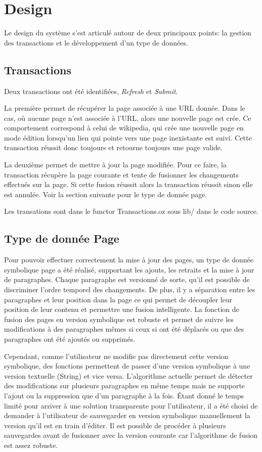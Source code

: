 \documentclass{article}
\begin{document}
	
	\section{Design}
	Le design du système s'est articulé autour de deux principaux points: la gestion des transactions et le développement
	d'un type de données.
	
	\subsection{Transactions}
	Deux transactions ont été identifiées, \textit{Refresh} et \textit{Submit}.  
	
	La première permet de récupérer la page associée à une URL donnée.  Dans le cas, où aucune page 
	n'est associée à l'URL, alors une nouvelle page est crée.  Ce comportement
	correspond à celui de wikipedia, qui crée une nouvelle page en mode édition lorsqu'un lien qui pointe vers une page
	inexistante est suivi.  Cette transaction réussit donc toujours et retourne toujours une page valide.
	
	La deuxième permet de mettre à jour la page modifiée.  Pour ce faire, la transaction récupère la page
	courante et tente de fusionner les changements effectués sur la page.  Si cette fusion réussit alors
	la transaction réussit sinon elle est annulée.  Voir la section suivante pour le type de donnée page.
	
	Les transations sont dans le functor Transactions.oz sous lib/ dans le code source.
	
	\subsection{Type de donnée Page}
	Pour pouvoir effectuer correctement la mise à jour des pages, un type de donnée symbolique page a été réalisé,
	supportant les ajouts, les retraits et la mise à jour de paragraphes.  Chaque paragraphe est versionné de sorte,
	qu'il est possible de discriminer l'ordre temporel des changements.  De plus, il y a séparation entre les paragraphes
	et leur position dans la page ce qui permet de découpler leur position de leur contenu et permettre une fusion intelligente.
	 La fonction de fusion des pages en version symbolique est robuste et permet de suivre les modifications à 
	 des paragraphes mêmes si ceux si ont été déplacés ou que des paragraphes ont été ajoutés ou supprimés.  
	 
	 Cependant, comme l'utilisateur ne modifie pas directement cette version symbolique, des fonctions permettent de passer
	d'une version symbolique à une version textuelle (String) et vice versa.  L'algorithme actuelle permet de détecter
	des modifications sur plusieurs paragraphes en même temps mais ne supporte l'ajout ou la suppression que d'un
	paragraphe à la fois.  Étant donné le temps limité pour arriver à une solution transparente pour l'utilisateur,
	il a été choisi de demander à l'utilisateur de sauvegarder en version symbolique manuellement la version qu'il est 
	en train d'éditer.  Il est possible de procéder à plusieurs sauvegardes avant de fusionner avec la version courante
	car l'algorithme de fusion est assez robuste.
\end{document}
